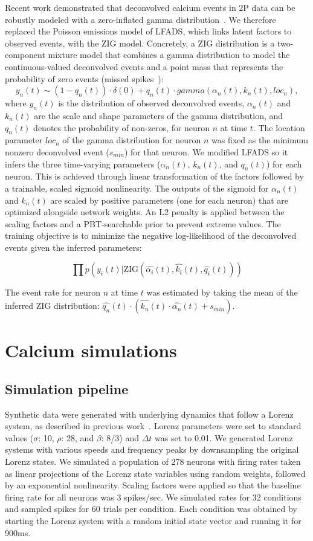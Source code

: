 \documentclass{article}
\begin{document}
Recent work demonstrated that deconvolved calcium events in 2P data can be robustly modeled with a zero-inflated gamma distribution~\cite{wei2020zero}. We therefore replaced the Poisson emissions model of LFADS, which links latent factors to observed events, with the ZIG model. Concretely, a ZIG distribution is a two-component mixture model that combines a gamma distribution to model the continuous-valued deconvolved events and a point mass that represents the probability of zero events (missed spikes~\cite{wei2020zero}):
\[y_n(t) \sim (1-q_n(t))\cdot\delta(0) + q_n(t)\cdot gamma(\alpha_n(t),k_n(t),loc_n),
\]
where $y_n(t)$ is the distribution of observed deconvolved events, $\alpha_n(t)$ and $k_n(t)$ are the scale and shape parameters of the gamma distribution, and $q_n(t)$ denotes the probability of non-zeros, for neuron $n$ at time $t$. The location parameter $loc_n$ of the gamma distribution for neuron $n$ was fixed as the minimum nonzero deconvolved event ($s_{min}$) for that neuron.  We modified LFADS so it infers the three time-varying parameters ($\alpha_n(t)$, $k_n(t)$, and $q_n(t)$) for each neuron. This is achieved through linear transformation of the factors followed by a trainable, scaled sigmoid nonlinearity. The outputs of the sigmoid for $\alpha_n(t)$ and $k_n(t)$ are scaled by positive parameters (one for each neuron) that are optimized alongside network weights. An L2 penalty is applied between the scaling factors and a PBT-searchable prior to prevent extreme values. The training objective is to minimize the negative log-likelihood of the deconvolved events given the inferred parameters:

\[\prod p(y_i(t)|\mathrm{ZIG}(\hat{\alpha_i}(t), \hat{k_i}(t), \hat{q_i}(t)))
\]

The event rate for neuron $n$ at time $t$ was estimated by taking the mean of the inferred ZIG distribution: $\hat{q_n}(t)\cdot(\hat{k_n}(t)\cdot\hat{\alpha_n}(t) + s_{min})$.

\section{Calcium simulations}

\subsection{Simulation pipeline}

Synthetic data were generated with underlying dynamics that follow a Lorenz system, as described in previous work~\cite{sussillo2016lfads,zhao2017variational}. Lorenz parameters were set to standard values ($\sigma$: 10, $\rho$: 28, and $\beta$: 8/3) and $\Delta t$ was set to 0.01. We generated Lorenz systems with various speeds and frequency peaks by downsampling the original Lorenz states. We simulated a population of 278 neurons with firing rates taken as linear projections of the Lorenz state variables using random weights, followed by an exponential nonlinearity. Scaling factors were applied so that the baseline firing rate for all neurons was 3 spikes/sec. We simulated rates for 32 conditions and sampled spikes for 60 trials per condition. Each condition was obtained by starting the Lorenz system with a random initial state vector and running it for 900ms.
\end{document}
